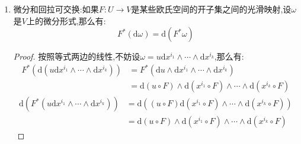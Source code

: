 \begin{enumerate}
\begin{proof}
    	首先如果$u$是一个零形式,即一个光滑函数:
    	\begin{align*}
    	\mathrm{d}(\mathrm{d}u)&=\mathrm{d}\left(\sum_j\frac{\partial u}{\partial x^j}\mathrm{d}x^j\right)=\sum_{i,j}\frac{\partial^2u}{\partial x^i\partial x^j}\mathrm{d}x^i\wedge\mathrm{d}x^j\\&=\sum_{i<j}\left(\frac{\partial^2u}{\partial x^i\partial x^j}-\frac{\partial^2u}{\partial x^j\partial x^i}\right)\mathrm{d}x^i\wedge\mathrm{d}x^j=0
    	\end{align*}
    	
    	再设$\omega$是一个$k$形式,结合反导数条件得到:
    	\begin{align*}
    	\mathrm{d}(\mathrm{d}\omega)&=\mathrm{d}\left(\sum_J\mathrm{d}\omega_J\wedge\mathrm{d}x^{j_1}\wedge\cdots\wedge\mathrm{d}x^{j_k}\right)\\&=\sum_J\mathrm{d}(\mathrm{d}\omega_J)\wedge\mathrm{d}x^{j_1}\wedge\cdots\wedge\mathrm{d}x^{j_k}+\sum_J\mathrm{d}\omega_J\wedge\mathrm{d}(\mathrm{d}x^J)=0
    	\end{align*}
    \end{proof}
    \item 微分和回拉可交换:如果$F:U\to V$是某些欧氏空间的开子集之间的光滑映射,设$\omega$是$V$上的微分形式,那么有:
    $$F^*(\mathrm{d}\omega)=\mathrm{d}(F^*\omega)$$
    \begin{proof}
    	
    	按照等式两边的线性,不妨设$\omega=u\mathrm{d}x^{i_1}\wedge\cdots\wedge\mathrm{d}x^{i_k}$,那么有:
    	\begin{align*}
    	F^*\left(\mathrm{d}(u\mathrm{d}x^{i_1}\wedge\cdots\wedge\mathrm{d}x^{i_k})\right)&=F^*\left(\mathrm{d}u\wedge\mathrm{d}x^{i_1}\wedge\cdots\wedge\mathrm{d}x^{i_k}\right)\\&=\mathrm{d}(u\circ F)\wedge\mathrm{d}(x^{i_1}\circ F)\wedge\cdots\wedge\mathrm{d}(x^{i_k}\circ F)
    	\end{align*}
    	\begin{align*}
    	\mathrm{d}\left(F^*(u\mathrm{d}x^{i_1}\wedge\cdots\wedge\mathrm{d}x^{i_k})\right)&=\mathrm{d}\left((u\circ F)\mathrm{d}(x^{i_1}\circ F)\wedge\cdots\wedge\mathrm{d}(x^{i_k}\circ F)\right)\\&=\mathrm{d}(u\circ F)\wedge\mathrm{d}(x^{i_1}\circ F)\wedge\cdots\wedge\mathrm{d}(x^{i_k}\circ F)
    	\end{align*}
    \end{proof}
\end{enumerate}

